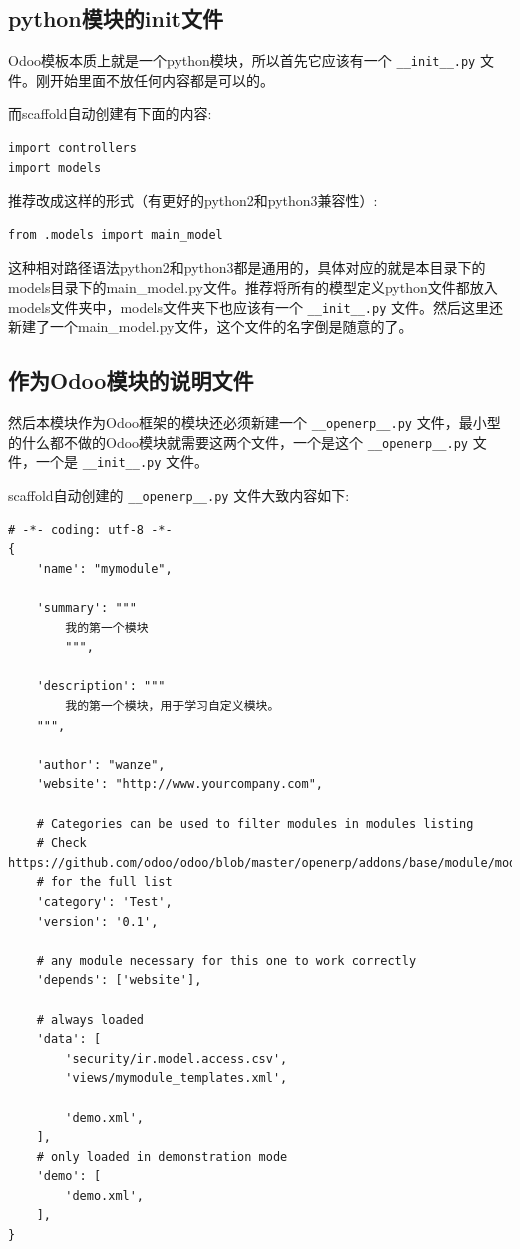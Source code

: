 \documentclass[11pt,a4paper]{sphinxmanual}
\begin{document}
\subsection{python模块的init文件}
\label{sec-5-1-1}
Odoo模板本质上就是一个python模块，所以首先它应该有一个 \verb~__init__.py~ 文件。刚开始里面不放任何内容都是可以的。

而scaffold自动创建有下面的内容: 
\begin{Verbatim}
import controllers
import models
\end{Verbatim}

推荐改成这样的形式（有更好的python2和python3兼容性）:
\begin{Verbatim}
from .models import main_model
\end{Verbatim}

这种相对路径语法python2和python3都是通用的，具体对应的就是本目录下的models目录下的main\_model.py文件。推荐将所有的模型定义python文件都放入models文件夹中，models文件夹下也应该有一个 \verb~__init__.py~ 文件。然后这里还新建了一个main\_model.py文件，这个文件的名字倒是随意的了。


\subsection{作为Odoo模块的说明文件}
\label{sec-5-1-2}
然后本模块作为Odoo框架的模块还必须新建一个 \verb~__openerp__.py~ 文件，最小型的什么都不做的Odoo模块就需要这两个文件，一个是这个 \verb~__openerp__.py~ 文件，一个是 \verb~__init__.py~ 文件。

scaffold自动创建的 \verb~__openerp__.py~ 文件大致内容如下: 

\begin{Verbatim}
# -*- coding: utf-8 -*-
{
    'name': "mymodule",

    'summary': """
        我的第一个模块
        """,

    'description': """
        我的第一个模块，用于学习自定义模块。
    """,

    'author': "wanze",
    'website': "http://www.yourcompany.com",

    # Categories can be used to filter modules in modules listing
    # Check https://github.com/odoo/odoo/blob/master/openerp/addons/base/module/module_data.xml
    # for the full list
    'category': 'Test',
    'version': '0.1',

    # any module necessary for this one to work correctly
    'depends': ['website'],

    # always loaded
    'data': [
        'security/ir.model.access.csv',
        'views/mymodule_templates.xml',

        'demo.xml',
    ],
    # only loaded in demonstration mode
    'demo': [
        'demo.xml',
    ],
}
\end{Verbatim}
\end{document}
